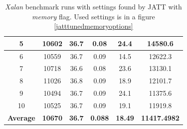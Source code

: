 \documentclass[
  digital, %
  oneside,
  notable, %
  nolof,     %
  nolot     %
]{fithesis3}
\begin{document}
\begin{table}[]
\begin{tabular}{|c|c|c|c|c|c|}
		5                & 10602                                                        & 36.7                                                                   & 0.08                                                                   & 24.4                                                                 & 14580.6                                                         \\ \hline
		6                & 10559                                                        & 36.7                                                                   & 0.09                                                                   & 14.5                                                                 & 12622.3                                                         \\ \hline
		7                & 10718                                                        & 36.6                                                                   & 0.08                                                                   & 23.6                                                                 & 13130.1                                                         \\ \hline
		8                & 11026                                                        & 36.8                                                                   & 0.09                                                                   & 18.9                                                                 & 12101.7                                                         \\ \hline
		9                & 10494                                                        & 36.7                                                                   & 0.09                                                                   & 24.1                                                                 & 11375.6                                                         \\ \hline
		10               & 10525                                                        & 36.7                                                                   & 0.09                                                                   & 19.1                                                                 & 11919.8                                                         \\ \hline
		\textbf{Average} & \textbf{10670}                                               & \textbf{36.7}                                                          & \textbf{0.088}                                                         & \textbf{18.49}                                                       & \textbf{11417.4982}                                             \\ \hline
	\end{tabular}
	\caption{\textit{Xalan} benchmark runs with settings found by JATT with \textit{memory} flag. Used settings is in a figure \ref{jatttunedmemoryoptions}}
	\label{jattmemoryresults}
\end{table}
\end{document}

